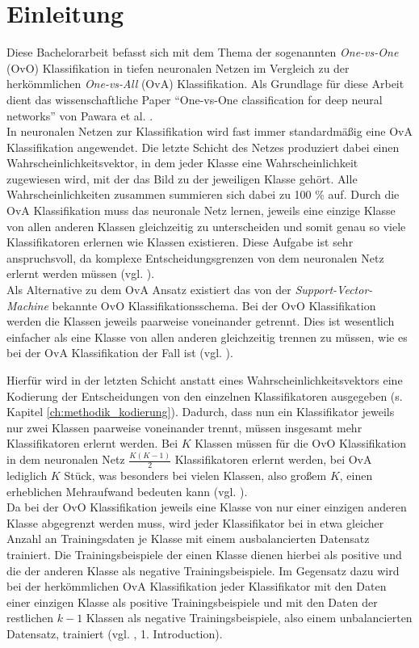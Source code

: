\chapter{Einleitung}
\label{ch:einleitung}
Diese Bachelorarbeit befasst sich mit dem Thema der sogenannten \textit{One-vs-One} (OvO) Klassifikation in tiefen neuronalen Netzen im Vergleich zu der herkömmlichen \textit{One-vs-All} (OvA) Klassifikation. Als Grundlage für diese Arbeit dient das wissenschaftliche Paper \enquote{One-vs-One classification for deep neural networks} von Pawara et al. \cite{pawaraPaper}.\\

In neuronalen Netzen zur Klassifikation wird fast immer standardmäßig eine OvA Klassifikation angewendet. Die letzte Schicht des Netzes produziert dabei einen Wahrscheinlichkeitsvektor, in dem jeder Klasse eine Wahrscheinlichkeit zugewiesen wird, mit der das Bild zu der jeweiligen Klasse gehört. Alle Wahrscheinlichkeiten zusammen summieren sich dabei zu 100 \% auf. Durch die OvA Klassifikation muss das neuronale Netz lernen, jeweils eine einzige Klasse von allen anderen Klassen gleichzeitig zu unterscheiden und somit genau so viele Klassifikatoren erlernen wie Klassen existieren. Diese Aufgabe ist sehr anspruchsvoll, da komplexe Entscheidungsgrenzen von dem neuronalen Netz erlernt werden müssen (vgl. \cite{pawaraPaper}).\\

Als Alternative zu dem OvA Ansatz existiert das von der \textit{Support-Vector-Machine} bekannte OvO Klassifikationsschema. Bei der OvO Klassifikation werden die Klassen jeweils paarweise voneinander getrennt. Dies ist wesentlich einfacher als eine Klasse von allen anderen gleichzeitig trennen zu müssen, wie es bei der OvA Klassifikation der Fall ist (vgl. \cite{pawaraPaper}).

Hierfür wird in der letzten Schicht anstatt eines Wahrscheinlichkeitsvektors eine Kodierung der Entscheidungen von den einzelnen Klassifikatoren ausgegeben (s. Kapitel \ref{ch:methodik_kodierung}).
Dadurch, dass nun ein Klassifikator jeweils nur zwei Klassen paarweise voneinander trennt, müssen insgesamt mehr Klassifikatoren erlernt werden.
Bei $K$ Klassen müssen für die OvO Klassifikation in dem neuronalen Netz $\frac{K(K-1)}{2}$ Klassifikatoren erlernt werden, bei OvA lediglich $K$ Stück, was besonders bei vielen Klassen, also großem $K$, einen erheblichen Mehraufwand bedeuten kann (vgl. \cite{pawaraPaper}).\\

Da bei der OvO Klassifikation jeweils eine Klasse von nur einer einzigen anderen Klasse abgegrenzt werden muss, wird jeder Klassifikator bei in etwa gleicher Anzahl an Trainingsdaten je Klasse mit einem ausbalancierten Datensatz trainiert. Die Trainingsbeispiele der einen Klasse dienen hierbei als positive und die der anderen Klasse als negative Trainingsbeispiele.
Im Gegensatz dazu wird bei der herkömmlichen OvA Klassifikation jeder Klassifikator mit den Daten einer einzigen Klasse als positive Trainingsbeispiele und mit den Daten der restlichen $k-1$ Klassen als negative Trainingsbeispiele, also einem unbalancierten Datensatz, trainiert (vgl. \cite{pawaraPaper}, 1. Introduction).\\

